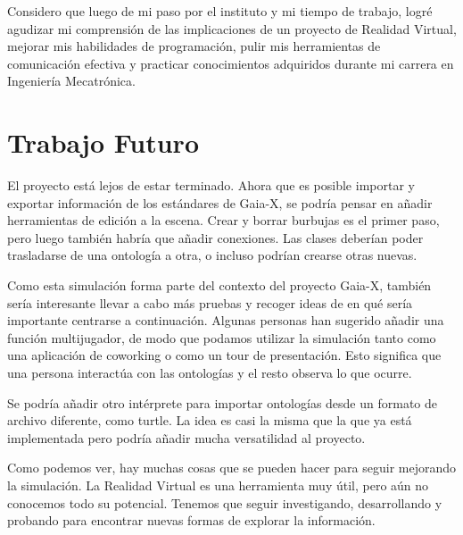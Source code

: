 Considero que luego de mi paso por el instituto y mi tiempo de trabajo, logré agudizar mi comprensión de las implicaciones de un proyecto de Realidad Virtual, mejorar mis habilidades de programación, pulir mis herramientas de comunicación efectiva y practicar conocimientos adquiridos durante mi carrera en Ingeniería Mecatrónica.

\section{Trabajo Futuro}

El proyecto está lejos de estar terminado. Ahora que es posible importar y exportar información de los estándares de Gaia-X, se podría pensar en añadir herramientas de edición a la escena.
Crear y borrar burbujas es el primer paso, pero luego también habría que añadir conexiones. Las clases deberían poder trasladarse de una ontología a otra, o incluso podrían crearse otras nuevas.

Como esta simulación forma parte del contexto del proyecto Gaia-X, también sería interesante llevar a cabo más pruebas y recoger ideas de en qué sería importante centrarse a continuación. Algunas personas han sugerido añadir una función multijugador, de modo que podamos utilizar la simulación tanto
como una aplicación de coworking o como un tour de presentación. Esto significa que una persona interactúa con las ontologías y el resto observa lo que ocurre.

Se podría añadir otro intérprete para importar ontologías desde un formato de archivo diferente, como turtle. La idea es casi la misma que la que ya está implementada pero podría añadir mucha versatilidad al proyecto.

Como podemos ver, hay muchas cosas que se pueden hacer para seguir mejorando la simulación. La Realidad Virtual es una herramienta muy útil, pero aún no conocemos todo su potencial. Tenemos que seguir investigando, desarrollando y probando para encontrar nuevas formas de explorar la información.